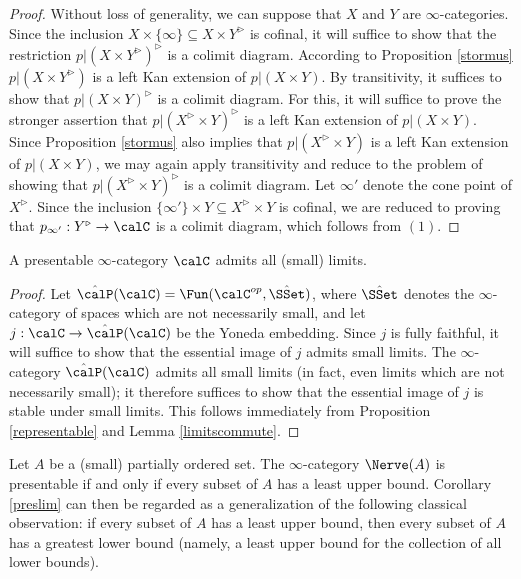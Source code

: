 \begin{proof}
Without loss of generality, we can suppose that $X$ and $Y$ are $\infty$-categories.
Since the inclusion $X \times \{\infty\} \subseteq X \times Y^{\triangleright}$ is cofinal, it will suffice to show that the restriction $p| (X \times Y^{\triangleright})^{\triangleright}$ is a colimit diagram.
According to Proposition \ref{stormus} $p|(X \times Y^{\triangleright})$ is a left
Kan extension of $p|(X \times Y)$. By transitivity, it suffices to show that 
$p| (X \times Y)^{\triangleright}$ is a colimit diagram. For this, it will suffice to prove the stronger assertion that $p| (X^{\triangleright} \times Y)^{\triangleright}$ is a left Kan extension of
$p| (X \times Y)$. Since Proposition \ref{stormus} also implies that
$p| (X^{\triangleright} \times Y)$ is a left Kan extension of $p|(X \times Y)$, we may
again apply transitivity and reduce to the problem of showing that
$p| (X^{\triangleright} \times Y)^{\triangleright}$ is a colimit diagram. Let $\infty'$
denote the cone point of $X^{\triangleright}$. Since
the inclusion $\{\infty'\} \times Y \subseteq X^{\triangleright} \times Y$ is cofinal, we
are reduced to proving that $p_{\infty'}: Y^{\triangleright} \rightarrow \calC$ is a colimit diagram, which follows from $(1)$.
\end{proof}

\begin{corollary}\label{preslim}
A presentable $\infty$-category $\calC$ admits all (small) limits.
\end{corollary}

\begin{proof}
Let $\hat{\calP}(\calC) = \Fun(\calC^{op}, \hat{ \SSet })$, where $\hat{\SSet}$ denotes the
$\infty$-category of spaces which are not necessarily small, and let $j: \calC \rightarrow \hat{\calP}(\calC)$ be the Yoneda embedding. Since $j$ is fully faithful, it will suffice to show that the essential image of $j$ admits small limits. The $\infty$-category
$\hat{\calP}(\calC)$ admits all small limits (in fact, even limits which are not necessarily small); it therefore suffices to show that the essential image of $j$ is stable under small limits.
This follows immediately from Proposition \ref{representable} and Lemma \ref{limitscommute}.
\end{proof}

\begin{remark}
Let $A$ be a (small) partially ordered set. The $\infty$-category $\Nerve(A)$ is presentable if and only if every subset of $A$ has a least upper bound. Corollary \ref{preslim} can then be regarded as a generalization of the following classical observation: if every subset of $A$ has a least upper bound, then every subset of $A$ has a greatest lower bound (namely, a least upper bound for the collection of all lower bounds). 
\end{remark}

